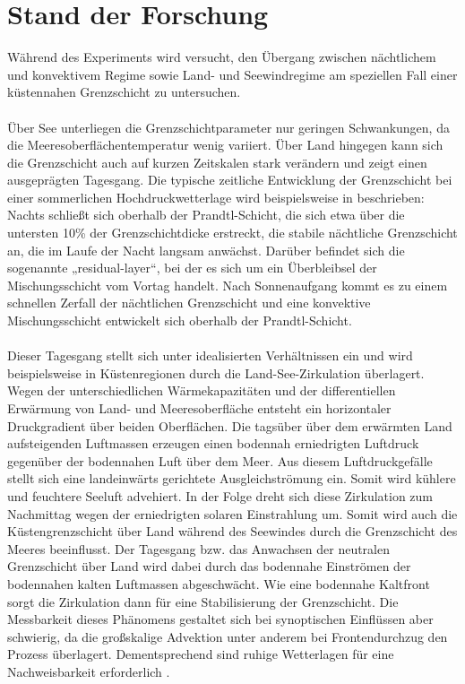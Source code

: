 \documentclass[a4paper,11pt,DIV=calc,tablecaptionabove,headinclude,twoside]{article}
\begin{document}
\section{Stand der Forschung}
Während des Experiments wird versucht, den Übergang zwischen nächtlichem und konvektivem Regime sowie Land- und Seewindregime am speziellen Fall einer küstennahen Grenzschicht zu untersuchen. \\\\
Über See unterliegen die Grenzschichtparameter nur geringen Schwankungen, da die Meeresoberflächentemperatur wenig variiert. Über Land hingegen kann sich die Grenzschicht auch auf kurzen Zeitskalen stark verändern und zeigt einen ausgeprägten Tagesgang. Die typische zeitliche Entwicklung der Grenzschicht bei einer sommerlichen Hochdruckwetterlage wird beispielsweise in \cite{stull1988introduction} beschrieben: Nachts schließt sich oberhalb der Prandtl-Schicht, die sich etwa über die untersten 10\% der Grenzschichtdicke erstreckt, die stabile nächtliche Grenzschicht an, die im Laufe der Nacht langsam anwächst. Darüber befindet sich die sogenannte „residual-layer“, bei der es sich um ein Überbleibsel der Mischungsschicht vom Vortag handelt. Nach Sonnenaufgang kommt es zu einem schnellen Zerfall der nächtlichen Grenzschicht und eine konvektive Mischungsschicht entwickelt sich oberhalb der Prandtl-Schicht. \\\\
Dieser Tagesgang stellt sich unter idealisierten Verhältnissen ein und wird beispielsweise in Küstenregionen durch die Land-See-Zirkulation überlagert. Wegen der unterschiedlichen Wärmekapazitäten und der differentiellen Erwärmung von Land- und Meeresoberfläche entsteht ein horizontaler Druckgradient über beiden Oberflächen. Die tagsüber über dem erwärmten Land aufsteigenden Luftmassen erzeugen einen bodennah erniedrigten Luftdruck gegenüber der bodennahen Luft über dem Meer.  
Aus diesem Luftdruckgefälle stellt sich eine landeinwärts gerichtete Ausgleichströmung ein. Somit wird kühlere und feuchtere Seeluft advehiert. In der Folge dreht sich diese Zirkulation zum Nachmittag wegen der erniedrigten solaren Einstrahlung um. Somit wird auch die Küstengrenzschicht über Land während des Seewindes durch die Grenzschicht des Meeres beeinflusst. Der Tagesgang bzw. das Anwachsen der neutralen Grenzschicht über Land wird dabei durch das bodennahe Einströmen der bodennahen kalten Luftmassen abgeschwächt. Wie eine bodennahe Kaltfront sorgt die Zirkulation dann für eine Stabilisierung der Grenzschicht. Die Messbarkeit dieses Phänomens gestaltet sich bei synoptischen Einflüssen aber schwierig, da die großskalige Advektion unter anderem bei Frontendurchzug den Prozess überlagert. Dementsprechend sind ruhige Wetterlagen für eine Nachweisbarkeit erforderlich \citep{Lange2004}.\\\\
\end{document}
